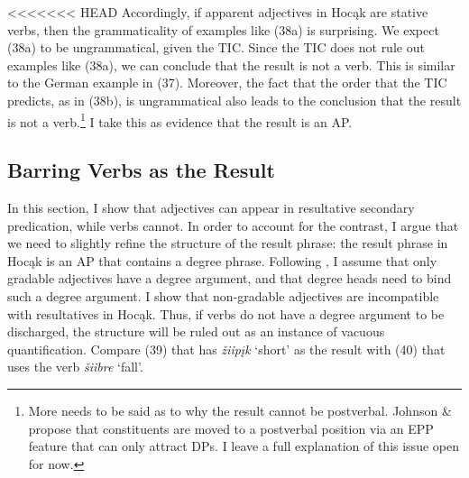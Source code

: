 \documentclass[output=paper]{LSP/langsci}
\begin{document}
\begin{exe}
\begin{exe}
\begin{exe}
\begin{exe}
{\begin{exe}
\begin{exe}
\begin{xlist}
{

\end{xlist}
\end{exe}

<<<<<<< HEAD
Accordingly, if apparent adjectives in Hocąk are stative verbs, then the grammaticality of examples like (38a) is surprising. We expect (38a) to be ungrammatical, given the TIC. Since the TIC does not rule out examples like (38a), we can conclude that the result is not a verb. This is similar to the German example in (37). Moreover, the fact that the order that the TIC predicts, as in (38b), is ungrammatical also leads to the conclusion that the result is not a verb.\footnote{More needs to be said as to why the result cannot be postverbal. Johnson \& \citet{Rosen2014} propose that constituents are moved to a postverbal position via an EPP feature that can only attract DPs. I leave a full explanation of this issue open for now.} I take this as evidence that the result is an AP.

\subsection{Barring Verbs as the Result}

In this section, I show that adjectives can appear in resultative secondary predication, while verbs cannot. In order to account for the contrast, I argue that we need to slightly refine the structure of the result phrase: the result phrase in Hocąk is an AP that contains a degree phrase. Following \citet{Cover1997}, I assume that only gradable adjectives have a degree argument, and that degree heads need to bind such a degree argument. I show that non-gradable adjectives are incompatible with resultatives in Hocąk. Thus, if verbs do not have a degree argument to be discharged, the structure will be ruled out as an instance of vacuous quantification. Compare (39) that has \textit{žiipįk} `short' as the result with (40) that uses the verb \textit{šiibre} `fall'.

\begin{exe}


\end{exe}
\end{exe}}
\end{exe}
\end{exe}
\end{exe}
\end{exe}
\end{document}
